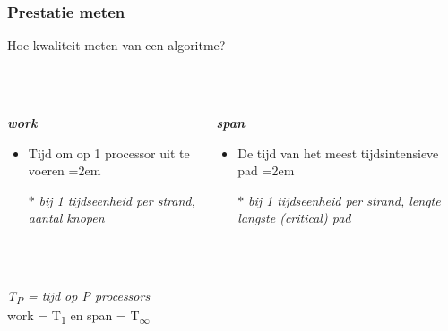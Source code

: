 \documentclass
   [kulak] %
   {kulakbeamer}
\begin{document}
\begin{frame}
	\frametitle{Prestatie meten}
	
	Hoe kwaliteit meten van een algoritme? \\~\\~\\
	\pause
	\begin{columns}[T]
		\begin{column}{.45\textwidth}
			\textbf{\textit{work}}
			\begin{itemize}
				\item Tijd om op 1 processor uit te voeren
				\itemsep=2em
				\item[$\ast$] \textit{bij 1 tijdseenheid per strand, aantal knopen}
			\end{itemize}
		\end{column}
		\begin{column}{.45\textwidth}
			\pause
			\textbf{\textit{span}}
			\begin{itemize}
				\item De tijd van het meest tijdsintensieve pad
				\itemsep=2em
				\item[$\ast$] \textit{bij 1 tijdseenheid per strand, lengte langste (critical) pad}
			\end{itemize}
		\end{column}
	\end{columns}
	\pause
	~\\~\\
	\textit{T\textsubscript{P} = tijd op P processors}\\
	work = T\textsubscript{1} en span = T\textsubscript{$\infty$}
\end{frame}
\end{document}
